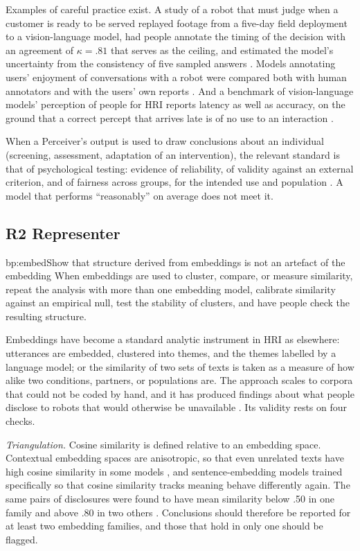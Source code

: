 Examples of careful practice exist. A study of a robot that must judge when
a customer is ready to be served replayed footage from a five-day field
deployment to a vision-language model, had people annotate the timing of
the decision with an agreement of $\kappa=.81$ that serves as the ceiling,
and estimated the model's uncertainty from the consistency of five sampled
answers \cite{bu2025using}. Models annotating users' enjoyment of
conversations with a robot were compared both with human annotators and
with the users' own reports \cite{pereira2024multimodal}. And a benchmark of
vision-language models' perception of people for HRI reports latency as
well as accuracy, on the ground that a correct percept that arrives late is
of no use to an interaction \cite{shi2025hribench}.

When a Perceiver's output is used to draw conclusions about an individual
(screening, assessment, adaptation of an intervention), the relevant standard
is that of psychological testing: evidence of reliability, of validity
against an external criterion, and of fairness across groups, for the
intended use and population \cite{aera2014standards}. A model that performs
``reasonably'' on average does not meet it.

\subsection{R2 Representer}

\begin{practice}{bp:embed}{Show that structure derived from embeddings is not an artefact of the embedding}
When embeddings are used to cluster, compare, or measure similarity, repeat
the analysis with more than one embedding model, calibrate similarity against
an empirical null, test the stability of clusters, and have people check the
resulting structure.
\end{practice}

Embeddings have become a standard analytic instrument in HRI as elsewhere:
utterances are embedded, clustered into themes, and the themes labelled by a
language model; or the similarity of two sets of texts is taken as a measure
of how alike two conditions, partners, or populations are. The approach
scales to corpora that could not be coded by hand, and it has produced
findings about what people disclose to robots that would otherwise be
unavailable \cite{chiang2025selfdisclosure,laban2025what}. Its validity rests
on four checks.

\emph{Triangulation.} Cosine similarity is defined relative to an embedding
space. Contextual embedding spaces are anisotropic, so that even unrelated
texts have high cosine similarity in some models
\cite{ethayarajh2019how}, and sentence-embedding models trained
specifically so that cosine similarity tracks meaning
\cite{reimers2019sentencebert} behave differently again. The same pairs
of disclosures were found to have mean similarity below .50 in one family and
above .80 in two others \cite{chiang2025selfdisclosure}. Conclusions should
therefore be reported for at least two embedding families, and those that
hold in only one should be flagged.

